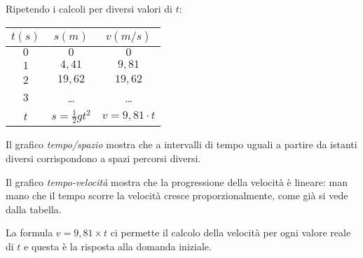 \noindent \begin{minipage}{0.35\textwidth}
Ripetendo i calcoli per diversi valori di \(t\):
 \begin{center}
\begin{tabular}{ccc}\toprule
\(t (s)\)      & \(s (m)\) & \(v(m/s)\)  \\\midrule
\(0\)      & \(0\)                 & \(0\)  \\
\(1\)      & \(4,41\)              & \(9,81\) \\
\(2\)      & \(19,62\)             & \(19,62\) \\
\(3\)      & \dots                 & \dots \\
\(t\)      & \(s=\frac{1}{2}gt^2\) & \(v=9,81 \cdot t\) \\\bottomrule
\end{tabular}
\label{tab:diff_velocita}
\end{center}
 \end{minipage}
  \hfill
 \begin{minipage}{.63 \textwidth}
 \end{minipage}

Il grafico \emph{tempo/spazio} mostra che a intervalli di tempo uguali 
a partire da istanti diversi corrispondono a spazi percorsi diversi. 

Il grafico \emph{tempo-velocità} mostra che la progressione della velocità 
è lineare: man mano che il tempo scorre la velocità cresce 
proporzionalmente, come già si vede dalla tabella.

La formula \quad \(v=9,81\times t\) \quad ci permette il calcolo della 
velocità per ogni valore reale di \(t\) e questa è la risposta alla domanda 
iniziale. 

% 


